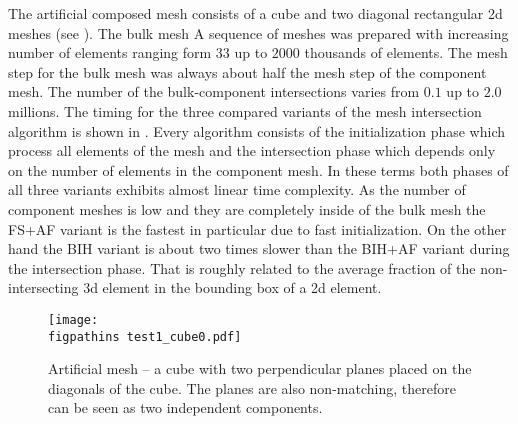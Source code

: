 % 

The artificial composed mesh consists of a cube and two diagonal rectangular 2d meshes (see ). The bulk mesh 
A sequence of meshes was prepared with increasing number of elements ranging
form $33$ up to $2000$ thousands of elements. The mesh step for the bulk mesh was always about half the mesh step of the component mesh. 
The number of the bulk-component intersections varies from $0.1$ up to $2.0$ millions. The timing for the three compared variants
of the mesh intersection algorithm is shown in . Every algorithm consists of the initialization phase which process all elements of the mesh 
and the intersection phase which depends only on the number of elements in the component mesh. In these terms both phases of all three variants exhibits almost 
linear time complexity. As the number of component meshes is low and they are completely inside of the bulk mesh the FS+AF variant is the fastest in particular
due to fast initialization. On the other hand the BIH variant is about two times slower than the BIH+AF variant during the intersection phase. 
That is roughly related to the average fraction of the non-intersecting 3d element in the bounding box of a 2d element.


\begin{figure}[!htb]
    \centering
    \texttt{[image: \\figpathins test1\_cube0.pdf]}
    \caption[Cube intersected by two diagonal fractures.]
    {Artificial mesh -- a cube with two perpendicular planes placed on the diagonals of the cube.
        The planes are also non-matching, therefore can be seen as two independent components.}
    \label{fig:cube_mesh}
\end{figure}
  
